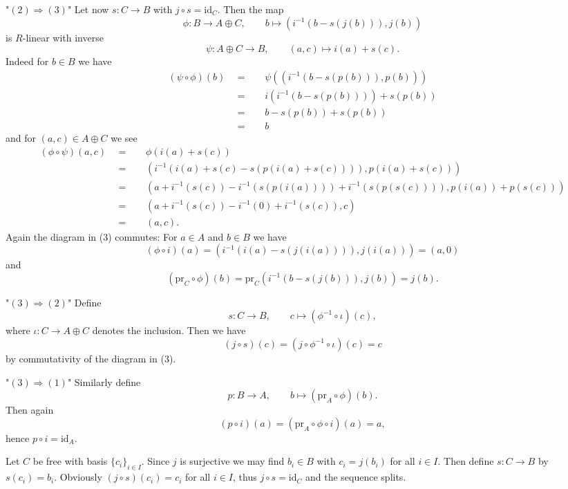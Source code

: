 \documentclass[11pt]{book}
\numberwithin{dummy}{section}
\theoremstyle{nonumberbreak}
\newenvironment{sol}[1][]{\ifthenelse{\equal{#1}{}}{\solution}{\solution[#1]}\rm}{\endsolution}
\newenvironment{prob}[1][]{\ifthenelse{\equal{#1}{}}{\problem}{\problem[#1]}\rm}{\endproblem}
\newcommand{\la}{\longrightarrow}
\newcommand{\id}{\mathrm{id}}
\begin{document}
\begin{spacing}{1.4}
\begin{prob}
\begin{sol}
\begin{compactenum}
\begin{compactenum}
\item["$(2)\Rightarrow(3)$"] Let now $s: C \la B$ with $j \circ s = \id_C$. Then the map
$$\phi: B \la A \oplus C, \qquad b \mapsto \left( i^{-1}\left( b- s(j(b))\right), j(b)\right)$$
is $R$-linear with inverse 
$$\psi: A \oplus C \la B, \qquad (a,c) \mapsto i(a) + s(c).$$
Indeed for $b \in B$ we have 
\begin{alignat*}{5}
(\psi \circ \phi)(b) \ \  &=&& \ \ \psi \left(\left(i^{-1}( b - s(p(b))), p(b) \right)\right) \\
&=&& \ \ i \left( i^{-1}\left(b-s(p(b))\right) \right) + s(p(b)) \\
&=&& \ \ b- s(p(b)) + s(p(b)) \\
&=&& \ \ b
\end{alignat*}
and for $(a,c) \in A \oplus C$ we see
\begin{alignat*}{5}
(\phi \circ \psi)(a,c) \ \ &=&& \ \ \phi\left( i(a) + s(c)\right) \\
&=&& \ \ \left( i^{-1}\left(i(a)+s(c)-s\left(p(i(a)+s(c))\right) \right), p(i(a)+s(c)) \right) \\
&=&& \ \ \left( a + i^{-1}(s(c)) - i^{-1}(s(p(i(a)))) + i^{-1}(s(p(s(c)))), p(i(a)) + p(s(c)) \right) \\
&=&& \ \ \left( a + i^{-1}(s(c)) -i^{-1}(0) + i^{-1}(s(c)), c \right) \\
&=&& \ \ \left( a,c \right).
\end{alignat*}
Again the diagram in (3) commutes: For $a \in A$ and $b\in B$ we have 
$$(\phi \circ i)(a) = \left( i^{-1}\left(i(a) - s(j(i(a)))\right), j(i(a))\right) = (a,0)$$
and
$$(\mathrm{pr}_C \circ \phi)(b) = \mathrm{pr}_C\left(i^{-1}\left( b - s(j(b))\right), j(b)\right) = j(b).$$
\item["$(3)\Rightarrow(2)$"] Define
$$s: C \la B, \qquad c \mapsto (\phi^{-1}\circ \iota)(c),$$
where $\iota: C \la A \oplus C$ denotes the inclusion. Then we have 
$$(j \circ s)(c) = (j \circ \phi^{-1} \circ \iota)(c) = c$$
by commutativity of the diagram in (3).
\item["$(3)\Rightarrow(1)$"] Similarly define
$$p: B \la A, \qquad b \mapsto (\mathrm{pr}_A\circ \phi)(b).$$
Then again
$$(p \circ i)(a) = (\mathrm{pr}_A \circ \phi \circ i)(a) = a,$$
hence $p \circ i = \id_A$.
\end{compactenum}
\item Let $C$ be free with basis $\{c_i\}_{i \in I}$. Since $j$ is surjective we may find $b_i \in B$ with $c_i = j(b_i)$ for all $i \in I$. Then define $s: C \la B$ by $s(c_i) = b_i$. Obviously $(j \circ s)(c_i) = c_i$ for all $i \in I$, thus $j \circ s = \id_C$ and the sequence splits.


\end{compactenum}
\end{sol}
\end{prob}
\end{spacing}
\end{document}
